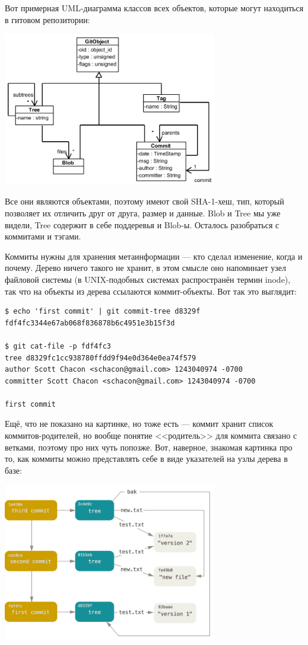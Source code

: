 \documentclass{../text-style}
\begin{document}
Вот примерная UML-диаграмма классов всех объектов, которые могут находиться в гитовом репозитории:
\begin{center}
    \includegraphics[width=0.7\textwidth]{gitDataStructure.png}
\end{center}

Все они являются объектами, поэтому имеют свой SHA-1-хеш, тип, который позволяет их отличить друг от друга, размер и данные. Blob и Tree мы уже видели, Tree содержит в себе поддеревья и Blob-ы. Осталось разобраться с коммитами и тэгами. 

Коммиты нужны для хранения метаинформации --- кто сделал изменение, когда и почему. Дерево ничего такого не хранит, в этом смысле оно напоминает узел файловой системы (в UNIX-подобных системах распространён термин inode), так что на объекты из дерева ссылаются коммит-объекты. Вот так это выглядит:
\begin{verbatim}
$ echo 'first commit' | git commit-tree d8329f
fdf4fc3344e67ab068f836878b6c4951e3b15f3d

$ git cat-file -p fdf4fc3
tree d8329fc1cc938780ffdd9f94e0d364e0ea74f579
author Scott Chacon <schacon@gmail.com> 1243040974 -0700
committer Scott Chacon <schacon@gmail.com> 1243040974 -0700

first commit
\end{verbatim}

Ещё, что не показано на картинке, но тоже есть --- коммит хранит список коммитов-родителей, но вообще понятие <<родитель>> для коммита связано с ветками, поэтому про них чуть попозже. Вот, наверное, знакомая картинка про то, как коммиты можно представлять себе в виде указателей на узлы дерева в базе:

\begin{center}
    \includegraphics[width=0.7\textwidth]{gitCommitObjects.png}
\end{center}
\end{document}

